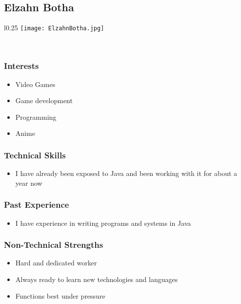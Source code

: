 
\subsection{Elzahn Botha}
\begin{wrapfigure}[6]{l}{0.25\textwidth}
\vspace{10pt}
\texttt{[image: ElzahnBotha.jpg]}
\end{wrapfigure}

\textcolor{white}{.}
\subsubsection{Interests}
\begin{itemize}
	\item{Video Games}
	\item{Game development}
	\item{Programming}
	\item{Anime}
\end{itemize}
\subsubsection{Technical Skills} 
\begin{itemize}
	\item{I have already been exposed to Java and been working with it for about a year now}
\end{itemize}
\subsubsection{Past Experience}
\begin{itemize}
	\item{I have experience in writing programs and systems in Java}
\end{itemize}
\subsubsection{Non-Technical Strengths} 
\begin{itemize}
	\item{Hard and dedicated worker}
	\item{Always ready to learn new technologies and languages}
	\item{Functions best under pressure}
\end{itemize}
